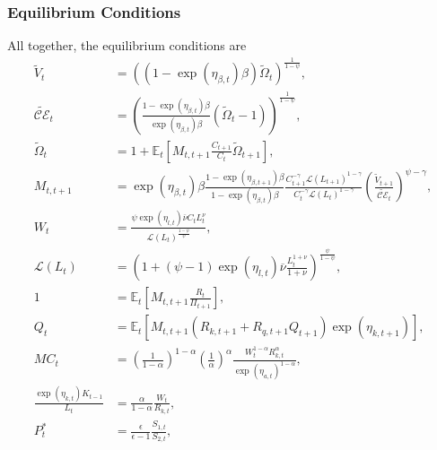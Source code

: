 \documentclass[12 pt, oneside]{article}
\theoremstyle{definition}
\theoremstyle{definition}
\theoremstyle{definition}
\newcommand{\E}{\mathbb{E}}
\newcommand{\calC}{\mathcal{C}}
\newcommand{\calE}{\mathcal{E}}
\newcommand{\calL}{\mathcal{L}}
\begin{document}
\subsubsection{Equilibrium Conditions}
All together, the equilibrium conditions are
\begin{align}
  \label{eq:epstein zin defn eqm}
  \tilde{V}_t & = ((1 - \exp(\eta_{\beta, t})\beta)\tilde{\Omega}_t)^{\frac{1}{1 - \psi}},\\
  \label{eq:certainty equivalent eqm}
  \tilde{\calC\calE}_t & = \left(\frac{1 - \exp(\eta_{\beta, t})\beta}{\exp(\eta_{\beta, t})\beta}(\tilde{\Omega}_t - 1)\right)^{\frac{1}{1 - \psi}},\\
  \label{eq:epstein zin wealth recursion eqm}
  \tilde{\Omega}_t & = 1 + \E_t\left[M_{t, t + 1}\frac{C_{t + 1}}{C_t}\tilde{\Omega}_{t + 1}\right],\\
  \label{eq:stochastic discount factor eqm}
  M_{t, t + 1} & = \exp(\eta_{\beta, t})\beta\frac{1 - \exp(\eta_{\beta, t + 1})\beta}{1 - \exp(\eta_{\beta, t})\beta} \frac{C_{t + 1}^{- \gamma } \calL(L_{t + 1})^{1 - \gamma}}{C_t^{-\gamma} \calL(L_t)^{1 - \gamma}}\left(\frac{\tilde{V}_{t + 1}}{\tilde{\calC\calE}_t}\right)^{ \psi - \gamma},\\
  \label{eq:intratemporal consumption labor eqm}
  W_t & = \frac{\psi \exp(\eta_{l, t})\overline{\nu} C_t L_t^\nu}{\calL(L_t)^{\frac{1 - \psi}{\psi}}},\\
  \label{eq:labor disutility function eqm}
  \calL(L_t) & = \left(1 + (\psi - 1)\exp(\eta_{l, t})\overline{\nu}\frac{L_t^{1 + \nu}}{1 + \nu}\right)^{\frac{\psi}{1-\psi}},\\
  \label{eq:euler eqn eqm}
  1 & = \E_t\left[M_{t, t + 1}\frac{R_t}{\Pi_{t + 1}}\right],\\
  \label{eq:capital asset pricing eqm}
  Q_t & = \E_t\left[M_{t, t + 1} \left(R_{k, t + 1} + R_{q, t + 1}Q_{t + 1}\right)\exp(\eta_{k, t + 1})\right],\\
  \label{eq:mc soln eqm}
  MC_t & =  \left(\frac{1}{1 - \alpha}\right)^{1 - \alpha}\left(\frac{1}{\alpha}\right)^{\alpha}\frac{W_t^{1 - \alpha}R_{k, t}^{\alpha}}{ \exp(\eta_{a, t})^{1 - \alpha}},\\
  \label{eq:optimal capital labor ratio eqm}
  \frac{\exp(\eta_{k, t})K_{t - 1}}{L_t} & =\frac{\alpha}{1 - \alpha} \frac{W_t}{R_{k, t}},\\
  \label{eq:real optimal reset price eqm}
  P_t^* & = \frac{\epsilon}{\epsilon - 1}\frac{S_{1, t}}{S_{2, t}},\\
  \label{eq:numerator recursion eqm}

\end{align}
\end{document}
